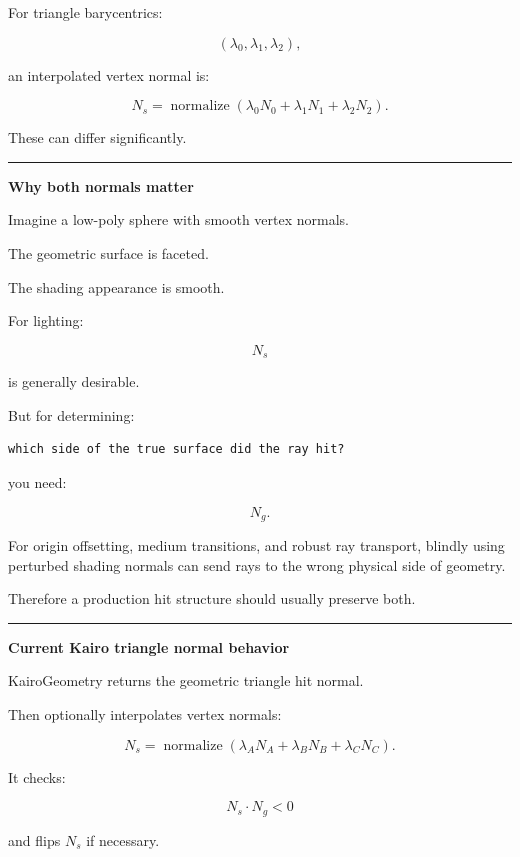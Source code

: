 For triangle barycentrics:

\[
(\lambda_0,\lambda_1,\lambda_2),
\]

an interpolated vertex normal is:

\[
\boxed{
N_s=
\operatorname{normalize}
(
\lambda_0N_0+
\lambda_1N_1+
\lambda_2N_2
).
}
\]

These can differ significantly.

\begin{center}\rule{0.5\linewidth}{0.5pt}\end{center}

\textbf{Why both normals matter}

Imagine a low-poly sphere with smooth vertex normals.

The geometric surface is faceted.

The shading appearance is smooth.

For lighting:

\[
N_s
\]

is generally desirable.

But for determining:

\begin{verbatim}
which side of the true surface did the ray hit?
\end{verbatim}

you need:

\[
N_g.
\]

For origin offsetting, medium transitions, and robust ray transport, blindly using perturbed shading normals can send rays to the wrong physical side of geometry.

Therefore a production hit structure should usually preserve both.

\begin{center}\rule{0.5\linewidth}{0.5pt}\end{center}

\textbf{Current Kairo triangle normal behavior}

KairoGeometry returns the geometric triangle hit normal.

Then  optionally interpolates vertex normals:

\[
N_s=
\operatorname{normalize}
(
\lambda_A N_A+
\lambda_B N_B+
\lambda_C N_C
).
\]

It checks:

\[
N_s\cdot N_g<0
\]

and flips \(N_s\) if necessary.

